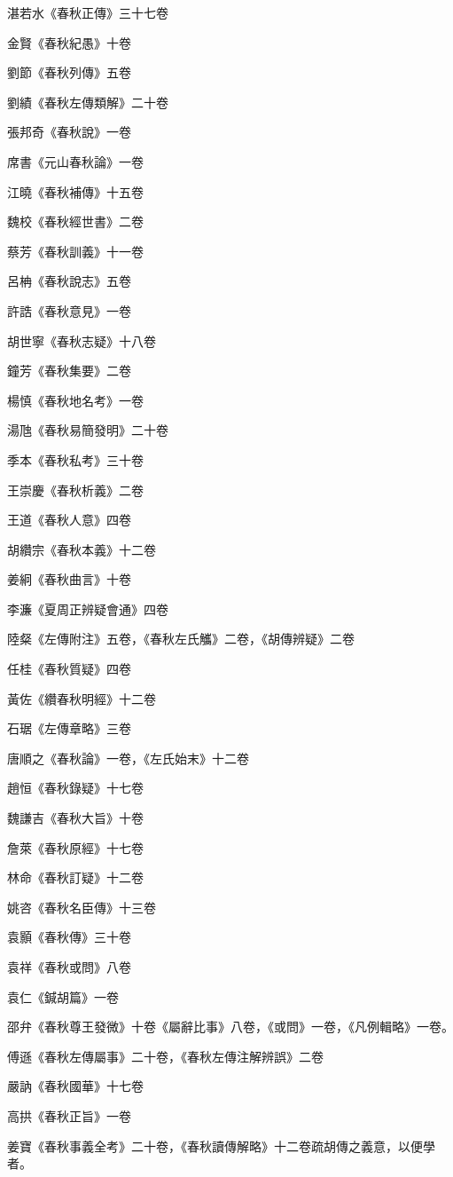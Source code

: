 湛若水《春秋正傳》三十七卷

金賢《春秋紀愚》十卷

劉節《春秋列傳》五卷

劉績《春秋左傳類解》二十卷

張邦奇《春秋說》一卷

席書《元山春秋論》一卷

江曉《春秋補傳》十五卷

魏校《春秋經世書》二卷

蔡芳《春秋訓義》十一卷

呂柟《春秋說志》五卷

許誥《春秋意見》一卷

胡世寧《春秋志疑》十八卷

鐘芳《春秋集要》二卷

楊慎《春秋地名考》一卷

湯虺《春秋易簡發明》二十卷

季本《春秋私考》三十卷

王崇慶《春秋析義》二卷

王道《春秋人意》四卷

胡纘宗《春秋本義》十二卷

姜絅《春秋曲言》十卷

李濂《夏周正辨疑會通》四卷

陸粲《左傳附注》五卷，《春秋左氏觿》二卷，《胡傳辨疑》二卷

任桂《春秋質疑》四卷

黃佐《纘春秋明經》十二卷

石琚《左傳章略》三卷

唐順之《春秋論》一卷，《左氏始末》十二卷

趙恒《春秋錄疑》十七卷

魏謙吉《春秋大旨》十卷

詹萊《春秋原經》十七卷

林命《春秋訂疑》十二卷

姚咨《春秋名臣傳》十三卷

袁顥《春秋傳》三十卷

袁祥《春秋或問》八卷

袁仁《鍼胡篇》一卷

邵弁《春秋尊王發微》十卷《屬辭比事》八卷，《或問》一卷，《凡例輯略》一卷。

傅遜《春秋左傳屬事》二十卷，《春秋左傳注解辨誤》二卷

嚴訥《春秋國華》十七卷

高拱《春秋正旨》一卷

姜寶《春秋事義全考》二十卷，《春秋讀傳解略》十二卷疏胡傳之義意，以便學者。

